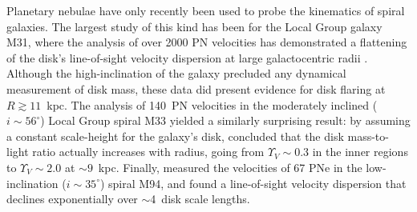 \documentclass[12pt,preprint]{emulateapj}
\begin{document}
Planetary nebulae have only recently been used to probe the kinematics of spiral galaxies.  The largest study of this kind has been for the Local Group galaxy M31, where the analysis of over 2000 PN velocities has demonstrated a flattening of the disk's line-of-sight velocity dispersion at large galactocentric radii \citep{M31PNS}.  Although the high-inclination of the galaxy precluded any dynamical measurement of disk mass, these data did present evidence for disk flaring at $R \gtrsim 11$~kpc.  The analysis of 140~PN velocities in the moderately inclined ($i \sim 56^\circ$) Local Group spiral M33 yielded a similarly surprising result:  by assuming a constant scale-height for the galaxy's disk, \citet{M33PNe} concluded that the disk mass-to-light ratio actually increases with radius, going from $\Upsilon_V \sim 0.3$ in the inner regions to $\Upsilon_V \sim 2.0$ at $\sim 9$~kpc.  Finally, \citet{M94PNS} measured the velocities of 67 PNe in the low-inclination ($i \sim 35^\circ$) spiral M94, and found a line-of-sight velocity dispersion that declines exponentially over $\sim$4~disk scale lengths.
\end{document}
